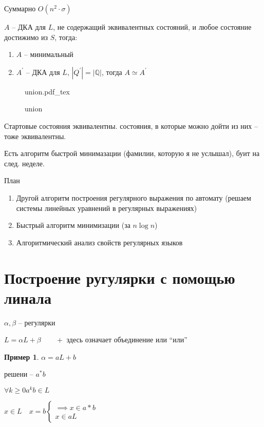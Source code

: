 \documentclass{book}
\newcommand\Q{\ensuremath{\mathbb{Q}}}
\newcommand{\p}[1]{#1^{\prime}}
\theoremstyle{definition}
\newtheorem*{example}{Пример}
\newcommand{\incfig}[1]{%
    \def\svgwidth{\columnwidth}
    {#1.pdf_tex}
}
\begin{document}
Суммарно  $O(n^2\cdot \sigma)$

\begin{theorem}
    $A$ -- ДКА для  $L$, не содержащий эквивалентных состояний, и любое состояние достижимо из $S$, тогда:
     \begin{enumerate}
        \item $A$ -- минимальный
        \item  $\p A$ -- ДКА для  $L$,  $|\p Q| = |\Q|$, тогда  $A\simeq \p A$
    \end{enumerate}
\end{theorem}

\begin{figure}[!ht]
    \centering
    \incfig{union}
    \caption{union}
    \label{fig:union}
\end{figure}

Стартовые состояния эквивалентны. состояния, в которые можно дойти из них -- тоже эквивалентны. 

Есть алгоритм быстрой минимазации (фамилии, которую я не услышал), буит на след. неделе.

План
\begin{enumerate}
    \item Другой алгоритм построения регулярного выражения по автомату (решаем системы линейных уравнений в регулярных выражениях)
    \item Быстрый алгоритм минимизации (за $n\log n$)
    \item Алгоритмический анализ свойств регулярных языков
\end{enumerate}

\section{Построение ругулярки с помощью линала}

$\alpha, \beta$ -- регулярки

$L = \alpha L + \beta\qquad +$ здесь означает объединение или ``или''

 \begin{example}
     $\alpha = a L + b$

     решени --  $a^*b$

      $\forall  k\geqslant 0 a^kb\in L$

      $x\in L\quad x = b \begin{cases}
          \implies x\in a*b\\
          x\in aL
      \end{cases}$
\end{example}
\end{document}
